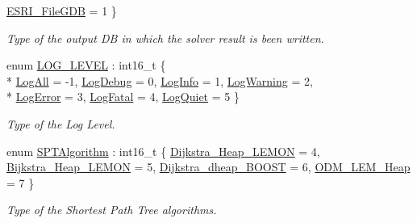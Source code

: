 \begin{DoxyCompactItemize}
\hyperlink{namespacenetxpert_1_1cnfg_a235b32f52360f5f331279b34e85064a5abb81749ad734681252e6b2c9f91c38df}{E\+S\+R\+I\+\_\+\+File\+G\+DB} = 1
 \}\begin{DoxyCompactList}\small\item\em Type of the output DB in which the solver result is been written. \end{DoxyCompactList}
\item 
enum \hyperlink{namespacenetxpert_1_1cnfg_ac9cb46108300f2d88ac15f7460ca0696}{L\+O\+G\+\_\+\+L\+E\+V\+EL} \+: int16\+\_\+t \{ \\*
\hyperlink{namespacenetxpert_1_1cnfg_ac9cb46108300f2d88ac15f7460ca0696aac903eea1288f6c6d924709a6ff8c0db}{Log\+All} = -\/1, 
\hyperlink{namespacenetxpert_1_1cnfg_ac9cb46108300f2d88ac15f7460ca0696a54720310e386ec5372d39d8db44e796c}{Log\+Debug} = 0, 
\hyperlink{namespacenetxpert_1_1cnfg_ac9cb46108300f2d88ac15f7460ca0696a8e9194abfb9d1ae1c84527e87f5d3a88}{Log\+Info} = 1, 
\hyperlink{namespacenetxpert_1_1cnfg_ac9cb46108300f2d88ac15f7460ca0696a3863429b4247f90b80b9500ee0279143}{Log\+Warning} = 2, 
\\*
\hyperlink{namespacenetxpert_1_1cnfg_ac9cb46108300f2d88ac15f7460ca0696a1470b9b468fec87067ef98ca3bb529c6}{Log\+Error} = 3, 
\hyperlink{namespacenetxpert_1_1cnfg_ac9cb46108300f2d88ac15f7460ca0696a42271ecb20211ef7991c7b55ba044621}{Log\+Fatal} = 4, 
\hyperlink{namespacenetxpert_1_1cnfg_ac9cb46108300f2d88ac15f7460ca0696acbe066a644e3fc003480708dd18ccc7d}{Log\+Quiet} = 5
 \}\begin{DoxyCompactList}\small\item\em Type of the Log Level. \end{DoxyCompactList}
\item 
enum \hyperlink{namespacenetxpert_1_1cnfg_a6ff755ed7f76e0049e3eeeed86c9b55d}{S\+P\+T\+Algorithm} \+: int16\+\_\+t \{ \hyperlink{namespacenetxpert_1_1cnfg_a6ff755ed7f76e0049e3eeeed86c9b55dad102d02d5d9fe173a6436a5387c89302}{Dijkstra\+\_\+Heap\+\_\+\+L\+E\+M\+ON} = 4, 
\hyperlink{namespacenetxpert_1_1cnfg_a6ff755ed7f76e0049e3eeeed86c9b55daa3460b7835997b44d4dabfa0f1a59999}{Bijkstra\+\_\+Heap\+\_\+\+L\+E\+M\+ON} = 5, 
\hyperlink{namespacenetxpert_1_1cnfg_a6ff755ed7f76e0049e3eeeed86c9b55daae8350a27b1b5c3b8c370026fe9d1f7e}{Dijkstra\+\_\+dheap\+\_\+\+B\+O\+O\+ST} = 6, 
\hyperlink{namespacenetxpert_1_1cnfg_a6ff755ed7f76e0049e3eeeed86c9b55da3b784ff83aaa97f8a687cc765b042d48}{O\+D\+M\+\_\+\+L\+E\+M\+\_\+Heap} = 7
 \}\begin{DoxyCompactList}\small\item\em Type of the Shortest Path Tree algorithms. \end{DoxyCompactList}

\end{DoxyCompactItemize}
